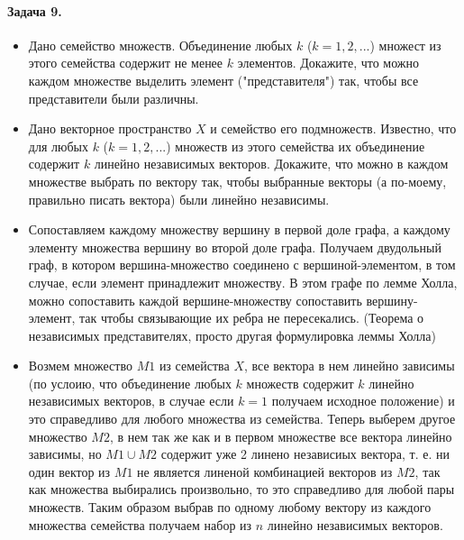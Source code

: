 \documentclass[a4paper,12pt]{article}
\begin{document}
\paragraph{Задача 9.}
\begin{itemize}
\item Дано семейство множеств. Объединение любых $k$ ($k=1,2,...$) множест из этого семейства содержит не менее $k$ элементов. Докажите, что можно  каждом множестве выделить элемент ("представителя") так, чтобы все представители были различны.

\item Дано векторное пространство $X$ и семейство его подмножеств. Известно, что для любых $k$ ($k=1,2,...$) множеств из этого семейства их объединение содержит $k$ линейно независимых векторов. Докажите, что можно в каждом множестве выбрать по вектору так, чтобы выбранные векторы (а по-моему, правильно писать вектора) были линейно независимы.
\end{itemize}

\begin{Proof}
\begin{itemize}
\item Сопоставляем каждому множеству вершину в первой доле графа, а каждому элементу множества вершину во второй доле графа. Получаем двудольный граф, в котором вершина-множество соединено с вершиной-элементом, в том случае, если элемент принадлежит множеству. В этом графе по лемме Холла, можно сопоставить каждой вершине-множеству сопоставить вершину-элемент, так чтобы связывающие их ребра не пересекались. (Теорема о независимых представителях, просто другая формулировка леммы Холла)

\item Возмем множество $M1$ из семейства $X$, все вектора в нем линейно зависимы (по услоию, что объединение любых $k$ множеств содержит $k$ линейно независимых векторов, в случае если $k=1$ получаем исходное положение) и это справедливо для любого множества из семейства. Теперь выберем другое множество $M2$, в нем так же как и в первом множестве все вектора линейно зависимы, но $M1 \cup M2$ содержит уже 2 линено независиых вектора, т. е. ни один вектор из $M1$ не является линеной комбинацией векторов из $M2$, так как множества выбирались произвольно, то это справедливо для любой пары множеств. Таким образом выбрав по одному любому вектору из каждого множества семейства получаем набор из $n$ линейно независимых векторов.
\end{itemize}
\end{Proof}
\end{document}
